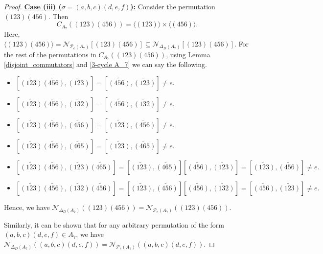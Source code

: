 \documentclass[10pt,a4paper]{amsart}
\begin{document}
\begin{proof}
\vspace{.3cm}
\noindent\underline{\bf{Case (iii) ($\sigma=(a,b,c)(d,e,f)$):}} Consider the permutation $(123)(456)$. Then \[C_{A_7}((123)(456))=\langle(123)\rangle\times\langle(456)\rangle.\] Here, $\langle(123)(456)\rangle=\mathcal{N}_{\mathcal{P}_e(A_7)}[(123)(456)]\subseteq\mathcal{N}_{\Delta_D(A_7)}[(123)(456)]$. For the rest of the permutations in $C_{A_7}((123)(456))$, using Lemma \ref{disjoint_commutators} and \ref{3-cycle A_7} we can say the following.
\begin{itemize}
    \item $[\tilde{(123)}\tilde{(456)},\tilde{(123)}]=[\tilde{(456)},\tilde{(123)}]\neq e.$
    \item $[\tilde{(123)}\tilde{(456)},\tilde{(132)}]=[\tilde{(456)},\tilde{(132)}]\neq e.$
    \item $[\tilde{(123)}\tilde{(456)},\tilde{(456)}]=[\tilde{(123)},\tilde{(456)}]\neq e.$
    \item $[\tilde{(123)}\tilde{(456)},\tilde{(465)}]=[\tilde{(123)},\tilde{(465)}]\neq e.$
    \item $[\tilde{(123)}\tilde{(456)},\tilde{(123)}\tilde{(465)}]=[\tilde{(123)},\tilde{(465)}][\tilde{(456)},\tilde{(123)}]=[\tilde{(123)},\tilde{(456)}]\neq e.$
    \item $[\tilde{(123)}\tilde{(456)},\tilde{(132)}\tilde{(456)}]=[\tilde{(123)},\tilde{(456)}][\tilde{(456)},\tilde{(132)}]=[\tilde{(456)},\tilde{(123)}]\neq e.$
\end{itemize}
Hence, we have $\mathcal{N}_{\Delta_D(A_7)}((123)(456))=\mathcal{N}_{\mathcal{P}_e(A_7)}((123)(456))$.

Similarly, it can be shown that for any arbitrary permutation of the form $(a,b,c)(d,e,f)\in A_7$, we have $\mathcal{N}_{\Delta_D(A_7)}((a,b,c)(d,e,f))=\mathcal{N}_{\mathcal{P}_e(A_7)}((a,b,c)(d,e,f))$.


\end{proof}
\end{document}
